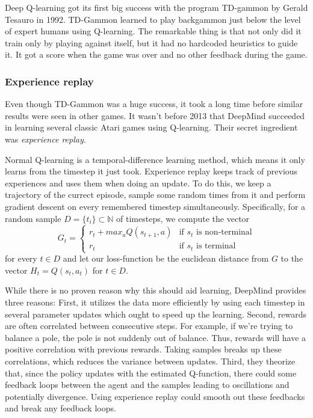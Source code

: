 \documentclass{article}
\theoremstyle{changedot}
\theoremstyle{changedotbreak}
\theoremstyle{nonumberplain}
\begin{document}
Deep Q-learning got its first big success with the program TD-gammon \cite{TDgammon} by Gerald Tesauro in 1992. TD-Gammon learned to play backgammon just below the level of expert humans using Q-learning. The remarkable thing is that not only did it train only by playing against itself, but it had no hardcoded heuristics to guide it. It got a score when the game was over and no other feedback during the game.

\subsubsection{Experience replay}
Even though TD-Gammon was a huge success, it took a long time before similar results were seen in other games. It wasn't before 2013 \cite{atari} that DeepMind succeeded in learning several classic Atari games using Q-learning. Their secret ingredient was \emph{experience replay}.

Normal Q-learning is a temporal-difference learning method, which means it only learns from the timestep it just took. Experience replay keeps track of previous experiences and uses them when doing an update. To do this, we keep a trajectory of the currect episode, sample some random times from it and perform gradient descent on every remembered timestep simultaneously. Specifically, for a random sample $D = \{t_{i}\} \subset \mathbb N$ of timesteps, we compute the vector
\[G_{t} =  \begin{cases}
    r_{t} + max_{a} Q(s_{t+1}, a) & \text{if $s_{t}$ is non-terminal} \\
    r_{t} & \text{if $s_{t}$ is terminal}
  \end{cases} \]
for every $t \in D$ and let our loss-function be the euclidean distance from $G$ to the vector $H_{t} = Q(s_{t}, a_{t})$ for $t \in D$.

While there is no proven reason why this should aid learning, DeepMind provides three reasons: First, it utilizes the data more efficiently by using each timestep in several parameter updates which ought to speed up the learning. Second, rewards are often correlated between consecutive steps. For example, if we're trying to balance a pole, the pole is not suddenly out of balance. Thus, rewards will have a positive correlation with previous rewards. Taking samples breaks up these correlations, which reduces the variance between updates. Third, they theorize that, since the policy updates with the estimated Q-function, there could some feedback loops between the agent and the samples leading to oscillations and potentially divergence. Using experience replay could smooth out these feedbacks and break any feedback loops.
\end{document}
